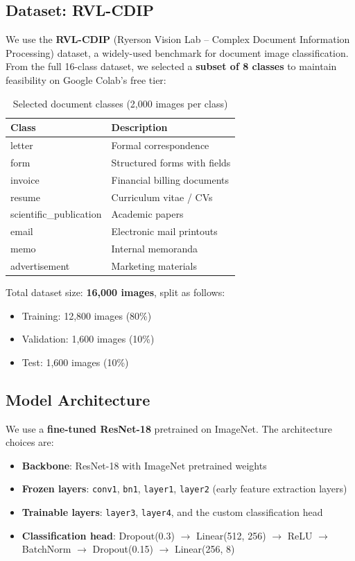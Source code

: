 \documentclass[12pt,a4paper]{article}
\begin{document}
\subsection{Dataset: RVL-CDIP}
We use the \textbf{RVL-CDIP} (Ryerson Vision Lab -- Complex Document Information Processing) dataset, a widely-used benchmark for document image classification. From the full 16-class dataset, we selected a \textbf{subset of 8 classes} to maintain feasibility on Google Colab's free tier:

\begin{table}[H]
\centering
\caption{Selected document classes (2,000 images per class)}
\begin{tabular}{@{}ll@{}}
\toprule
\textbf{Class} & \textbf{Description} \\
\midrule
letter & Formal correspondence \\
form & Structured forms with fields \\
invoice & Financial billing documents \\
resume & Curriculum vitae / CVs \\
scientific\_publication & Academic papers \\
email & Electronic mail printouts \\
memo & Internal memoranda \\
advertisement & Marketing materials \\
\bottomrule
\end{tabular}
\end{table}

Total dataset size: \textbf{16,000 images}, split as follows:
\begin{itemize}
    \item Training: 12,800 images (80\%)
    \item Validation: 1,600 images (10\%)
    \item Test: 1,600 images (10\%)
\end{itemize}

\subsection{Model Architecture}
We use a \textbf{fine-tuned ResNet-18} pretrained on ImageNet. The architecture choices are:

\begin{itemize}
    \item \textbf{Backbone}: ResNet-18 with ImageNet pretrained weights
    \item \textbf{Frozen layers}: \texttt{conv1}, \texttt{bn1}, \texttt{layer1}, \texttt{layer2} (early feature extraction layers)
    \item \textbf{Trainable layers}: \texttt{layer3}, \texttt{layer4}, and the custom classification head
    \item \textbf{Classification head}: Dropout(0.3) $\rightarrow$ Linear(512, 256) $\rightarrow$ ReLU $\rightarrow$ BatchNorm $\rightarrow$ Dropout(0.15) $\rightarrow$ Linear(256, 8)
\end{itemize}
\end{document}

